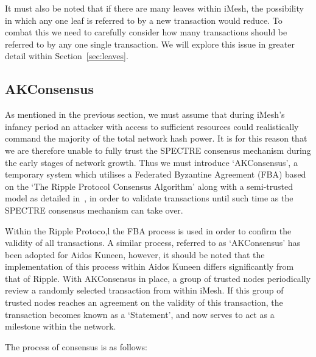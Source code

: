 \documentclass[a4paper,10pt,twocolumn]{article}
\begin{document}
	\vspace{2.5mm}
	
	It must also be noted that if there are many leaves within iMesh, the possibility in which any one leaf is referred to by a new 
	transaction would reduce. To combat this we need to carefully consider how many transactions should be referred to by any one single 
	transaction. We will explore this issue in greater detail within Section~\ref{sec:leaves}.
	
	\subsection{AKConsensus}
	\label{sec:AKConsensus}
	
	As mentioned in the previous section, we must assume that during iMesh's infancy period an attacker with access to sufficient resources 
	could realistically command the majority of the total network hash power. It is for this reason that we are therefore unable to fully 
	trust the SPECTRE consensus mechanism during the early stages of network growth. Thus we must introduce `AKConsensus',
	a temporary system which utilises a Federated Byzantine Agreement (FBA) based on the `The Ripple Protocol Consensus Algorithm' 
	along with a semi-trusted model as detailed in~\cite{ripple}, in order to validate transactions until such time as the SPECTRE consensus mechanism can take over.
	
	\vspace{2.5mm}
	
	Within the Ripple Protoco,l the FBA process is used in order to confirm the validity of all transactions.
	A similar process, referred to as `AKConsensus' has been adopted for Aidos Kuneen, however, it should be noted that the implementation 
	of this process within Aidos Kuneen differs significantly from that of Ripple. 
	With AKConsensus in place, a group of trusted nodes periodically review a randomly selected transaction from within iMesh.
	If this group of trusted nodes reaches an agreement on the validity of this transaction, the transaction becomes known as a `Statement', and now serves to act as a milestone within the network.
	
	\vspace{2.5mm}
	
	The process of consensus is as follows:
	
\end{document}
